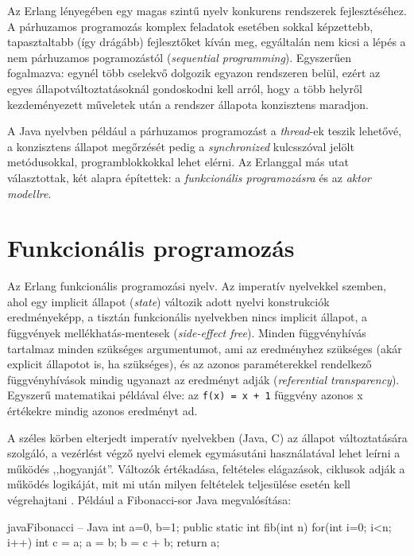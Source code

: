 \documentclass[12pt, a4paper, oneside]{book}
\begin{document}
Az Erlang lényegében egy magas szintű nyelv konkurens rendszerek
fejlesztéséhez. A párhuzamos programozás komplex feladatok esetében sokkal
képzettebb, tapasztaltabb (így drágább) fejlesztőket kíván meg, egyáltalán nem
kicsi a lépés a nem párhuzamos pogramozástól (\emph{sequential programming}).
Egyszerűen fogalmazva: egynél több cselekvő dolgozik egyazon rendszeren belül,
ezért az egyes állapotváltoztatásoknál gondoskodni kell arról, hogy a több
helyről kezdeményezett műveletek után a rendszer állapota konzisztens maradjon.

A Java nyelvben például a párhuzamos programozást a \emph{thread}-ek teszik
lehetővé, a konzisztens állapot megőrzését pedig a \emph{synchronized}
kulcsszóval jelölt metódusokkal, programblokkokkal lehet elérni. Az Erlanggal
más utat választottak, két alapra építettek: a \emph{funkcionális
programozásra} és az \emph{aktor modellre}.
 
\section{Funkcionális programozás} 

Az Erlang funkcionális programozási nyelv. Az imperatív nyelvekkel szemben,
ahol egy implicit állapot (\emph{state}) változik adott nyelvi konstrukciók
eredményeképp, a tisztán funkcionális nyelvekben nincs implicit állapot, a
függvények mellékhatás-mentesek (\emph{side-effect free}). Minden függvényhívás
tartalmaz minden szükséges argumentumot, ami az eredményhez szükséges (akár
explicit állapotot is, ha szükséges), és az azonos paraméterekkel rendelkező
függvényhívások mindig ugyanazt az eredményt adják (\emph{referential
transparency}). Egyszerű matematikai példával élve: az \texttt{f(x) = x + 1}
függvény azonos x értékekre mindig azonos eredményt ad.

A széles körben elterjedt imperatív nyelvekben (Java, C) az állapot
változtatására szolgáló, a vezérlést végző nyelvi elemek egymásutáni
használatával lehet leírni a működés ,,hogyanját''. Változók értékadása,
feltételes elágazások, ciklusok adják a működés logikáját, mit mi után milyen
feltételek teljesülése esetén kell végrehajtani \citep{Hudak}. Például a Fibonacci-sor Java
megvalósítása:

\begin{code}{java}{Fibonacci -- Java}
int a=0, b=1;
public static int fib(int n) {
  for(int i=0; i<n; i++) {
    int c = a;
    a = b;
    b = c + b;
  }
  return a;
}
\end{code}
\end{document}
